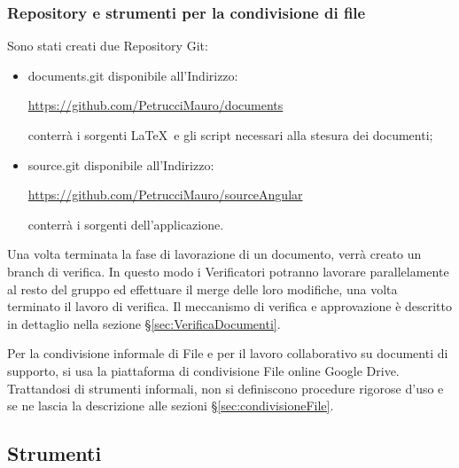 \subsubsection{Repository e strumenti per la condivisione di file}

Sono stati creati due Repository Git:
\begin{itemize}


\item documents.git disponibile all’Indirizzo:\\
\begin{center}\url{https://github.com/PetrucciMauro/documents}\\\end{center}
conterrà i sorgenti \LaTeX \ e gli script necessari alla stesura dei documenti;
\item source.git disponibile all’Indirizzo:\\
\begin{center}
\url{https://github.com/PetrucciMauro/sourceAngular}\\
\end{center}
conterrà i sorgenti dell’applicazione.\\
\end{itemize}
Una volta terminata la fase di lavorazione di un documento, verrà creato un branch di verifica. In questo modo i Verificatori potranno lavorare parallelamente al resto del gruppo ed effettuare il merge  delle loro modifiche, una volta terminato il lavoro di verifica.
Il meccanismo di verifica e approvazione è descritto in dettaglio nella sezione \S\ref{sec:VerificaDocumenti}.


Per la condivisione informale di File e per il lavoro collaborativo su documenti di supporto, si usa la piattaforma di condivisione File online Google Drive.
Trattandosi di strumenti informali, non si definiscono procedure rigorose d’uso e se ne lascia la descrizione alle sezioni \S\ref{sec:condivisioneFile}.


\subsection{Strumenti}

